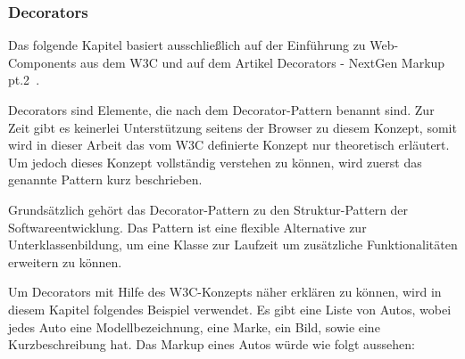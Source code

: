 \subsubsection{Decorators}
\label{sec:3_WC_Decorators}

Das folgende Kapitel basiert ausschließlich auf der Einführung zu Web-Components aus dem W3C \citereset \autocite[siehe][]{CooneyGlazkov.2013} und auf dem Artikel \glqq Decorators - NextGen Markup pt.2\grqq\ \citereset \autocite[siehe][]{PreventDefault.2013}.

Decorators sind Elemente, die nach dem Decorator-Pattern benannt sind. Zur Zeit gibt es keinerlei Unterstützung seitens der Browser zu diesem Konzept, somit wird in dieser Arbeit das vom W3C definierte Konzept nur theoretisch erläutert. Um jedoch dieses Konzept vollständig verstehen zu können, wird zuerst das genannte Pattern kurz beschrieben.

Grundsätzlich gehört das Decorator-Pattern zu den Struktur-Pattern der Softwareentwicklung. Das Pattern ist eine flexible Alternative zur Unterklassenbildung, um eine Klasse zur Laufzeit um zusätzliche Funktionalitäten erweitern zu können.

Um Decorators mit Hilfe des W3C-Konzepts näher erklären zu können, wird in diesem Kapitel folgendes Beispiel verwendet. Es gibt eine Liste von Autos, wobei jedes Auto
eine Modellbezeichnung, eine Marke, ein Bild, sowie eine Kurzbeschreibung hat. Das Markup eines Autos würde wie folgt aussehen:

